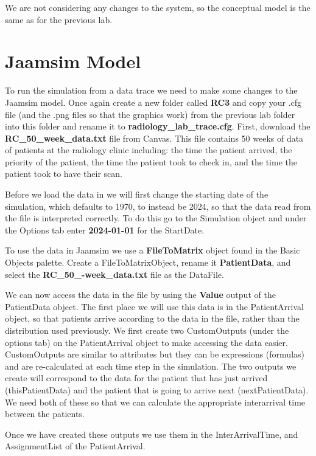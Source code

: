 \documentclass[
  10pt,
  a4paperpaper,
  DIV=11,
  numbers=noendperiod,
  oneside]{scrreprt}
\begin{document}
We are not considering any changes to the system, so the conceptual
model is the same as for the previous lab.

\section{Jaamsim Model}\label{jaamsim-model-2}

To run the simulation from a data trace we need to make some changes to
the Jaamsim model. Once again create a new folder called \textbf{RC3}
and copy your .cfg file (and the .png files so that the graphics work)
from the previous lab folder into this folder and rename it to
\textbf{radiology\_lab\_trace.cfg}. First, download the
\textbf{RC\_50\_week\_data.txt} file from Canvas. This file contains 50
weeks of data of patients at the radiology clinic including: the time
the patient arrived, the priority of the patient, the time the patient
took to check in, and the time the patient took to have their scan.

Before we load the data in we will first change the starting date of the
simulation, which defaults to 1970, to instead be 2024, so that the data
read from the file is interpreted correctly. To do this go to the
Simulation object and under the Options tab enter \textbf{2024-01-01}
for the StartDate.

To use the data in Jaamsim we use a \textbf{FileToMatrix} object found
in the Basic Objects palette. Create a FileToMatrixObject, rename it
\textbf{PatientData}, and select the \textbf{RC\_50\_-week\_data.txt}
file as the DataFile.

We can now access the data in the file by using the \textbf{Value}
output of the PatientData object. The first place we will use this data
is in the PatientArrival object, so that patients arrive according to
the data in the file, rather than the distribution used previously. We
first create two CustomOutputs (under the options tab) on the
PatientArrival object to make accessing the data easier. CustomOutputs
are similar to attributes but they can be expressions (formulas) and are
re-calculated at each time step in the simulation. The two outputs we
create will correspond to the data for the patient that has just arrived
(thisPatientData) and the patient that is going to arrive next
(nextPatientData). We need both of these so that we can calculate the
appropriate interarrival time between the patients.

Once we have created these outputs we use them in the InterArrivalTime,
and AssignmentList of the PatientArrival.
\end{document}
